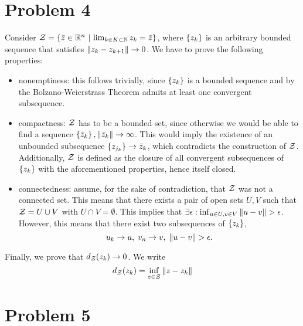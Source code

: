 \documentclass[10pt]{article}
\begin{document}
\section*{Problem 4}
Consider $\mathcal{Z} = \left\{ \bar{z} \in \mathbb{R}^n \ \middle| \  \lim_{k \in K \subset \mathbb{N}} z_{k}
= \bar{z} \right\}$, where $\left\{ z_k \right\}$ is an arbitrary bounded sequence that satisfies
$\left \| z_k - z_{k+1} \right \| \to 0$. We have to prove the following properties:
\begin{itemize}
\item nonemptiness: this follows trivially, since $\left\{ z_k \right\}$ is a bounded
sequence and by the Bolzano-Weierstrass Theorem admits at least one convergent
subsequence.
\item compactness: $\mathcal{Z}$ has to be a bounded set, since otherwise we would be
able to find a sequence $\left\{ \bar{z}_k \right\}, \left \| \bar{z}_k \right \| \to \infty$. This
would imply the existence of an unbounded subsequence $\left\{ z_{j_k} \right\} \to
\bar{z}_k$, which contradicts the construction of $\mathcal{Z}$.
Additionally, $\mathcal{Z}$ is defined as the closure of all convergent subsequences of
$\left\{ z_k \right\}$ with the aforementioned properties, hence itself closed.
\item connectedness: assume, for the sake of contradiction, that $\mathcal{Z}$ was not
a connected set. This means that there exists a pair of open sets $U, V$ such
that $\mathcal{Z} = U \cup V$ with $U \cap V = \emptyset$. This implies that
$\exists \epsilon: \inf_{u \in U, v \in V} \left \| u - v \right \| > \epsilon$. However,
this means that there exist two subsequences of $\left\{ z_k \right\}$,
\[
    u_{k} \to u, \; v_{n} \to v, \; \left \| u - v \right \| > \epsilon.
\]

\end{itemize}
Finally, we prove that $d_{\mathcal{Z}}(z_k) \to 0$. We write
\[
    d_{\mathcal{Z}}(z_k) = \inf_{z \in \mathcal{Z}} \left \| z - z_k \right \|
\]

\section*{Problem 5}
\end{document}
